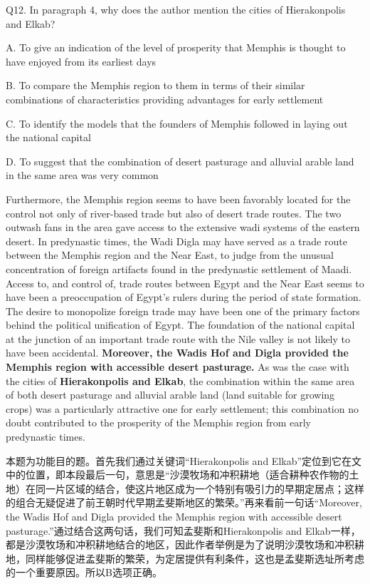 \begin{blk}
    \begin{qst}
        Q12. In paragraph 4, why does the author mention the cities of Hierakonpolis and Elkab?
    \end{qst}

    \begin{chc}
        A. To give an indication of the level of prosperity that Memphis is thought to have enjoyed from its earliest days

        B. To compare the Memphis region to them in terms of their similar combinations of characteristics providing advantages for early settlement

        C. To identify the models that the founders of Memphis followed in laying out the national capital

        D. To suggest that the combination of desert pasturage and alluvial arable land in the same area was very common
    \end{chc}

    \begin{psgq}
        Furthermore, the Memphis region seems to have been favorably located for the control not only of river-based trade but also of desert trade routes. The two outwash fans in the area gave access to the extensive wadi systems of the eastern desert. In predynastic times, the Wadi Digla may have served as a trade route between the Memphis region and the Near East, to judge from the unusual concentration of foreign artifacts found in the predynastic settlement of Maadi. Access to, and control of, trade routes between Egypt and the Near East seems to have been a preoccupation of Egypt’s rulers during the period of state formation. The desire to monopolize foreign trade may have been one of the primary factors behind the political unification of Egypt. The foundation of the national capital at the junction of an important trade route with the Nile valley is not likely to have been accidental. \textbf{Moreover, the Wadis Hof and Digla provided the Memphis region with accessible desert pasturage.} As was the case with the cities of \textbf{Hierakonpolis and Elkab}, the combination within the same area of both desert pasturage and alluvial arable land (land suitable for growing crops) was a particularly attractive one for early settlement; this combination no doubt contributed to the prosperity of the Memphis region from early predynastic times.
    \end{psgq}

    \begin{nlz}
        本题为功能目的题。首先我们通过关键词“Hierakonpolis and Elkab”定位到它在文中的位置，即本段最后一句，意思是“沙漠牧场和冲积耕地（适合耕种农作物的土地）在同一片区域的结合，使这片地区成为一个特别有吸引力的早期定居点；这样的组合无疑促进了前王朝时代早期孟斐斯地区的繁荣。”再来看前一句话“Moreover, the Wadis Hof and Digla provided the Memphis region with accessible desert pasturage.”通过结合这两句话，我们可知孟斐斯和Hierakonpolis and Elkab一样，都是沙漠牧场和冲积耕地结合的地区，因此作者举例是为了说明沙漠牧场和冲积耕地，同样能够促进孟斐斯的繁荣，为定居提供有利条件，这也是孟斐斯选址所考虑的一个重要原因。所以B选项正确。


\end{nlz}
\end{blk}
